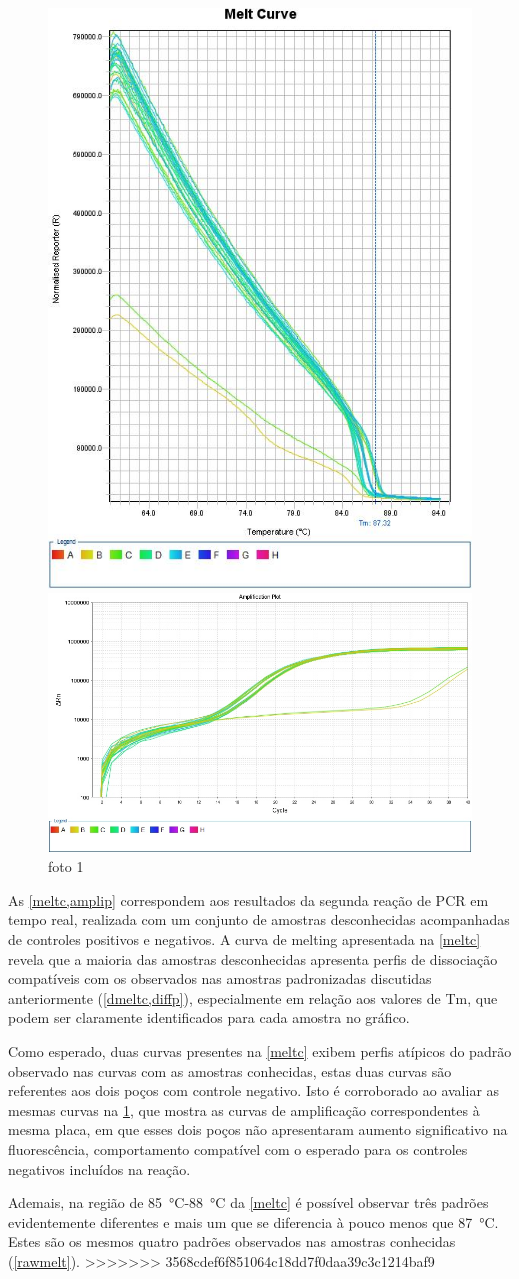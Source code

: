 \begin{figure}
        \centering
        \includegraphics[width=.4\textwidth]{fig/Melt Curve.jpg}
        \caption{foto 1}
        \label{meltc}
        \includegraphics[width=.4\textwidth]{fig/Amplification Plot.jpg}
        \caption{foto 1}
        \label{amplip}
\end{figure}

As \cref{meltc,amplip} correspondem aos resultados da segunda reação de PCR em
tempo real, realizada com um conjunto de amostras desconhecidas acompanhadas de
controles positivos e negativos. A curva de melting apresentada na \cref{meltc}
revela que a maioria das amostras desconhecidas apresenta perfis de dissociação
compatíveis com os observados nas amostras padronizadas discutidas anteriormente
(\cref{dmeltc,diffp}), especialmente em relação aos valores de Tm, que podem ser
claramente identificados para cada amostra no gráfico.

Como esperado, duas curvas presentes na \cref{meltc} exibem perfis atípicos do
padrão observado nas curvas com as amostras conhecidas, estas duas curvas são
referentes aos dois poços com controle negativo. Isto é corroborado ao avaliar
as mesmas curvas na \cref{amplip}, que mostra as curvas de amplificação
correspondentes à mesma placa, em que esses dois poços não apresentaram aumento
significativo na fluorescência, comportamento compatível com o esperado para os
controles negativos incluídos na reação.

Ademais, na região de \qty{85}{\celsius}-\qty{88}{\celsius} da \cref{meltc} é
possível observar três padrões evidentemente diferentes e mais um que se
diferencia à pouco menos que \qty{87}{\celsius}. Estes são os mesmos quatro
padrões observados nas amostras conhecidas (\cref{rawmelt}).
>>>>>>> 3568cdef6f851064c18dd7f0daa39c3c1214baf9
